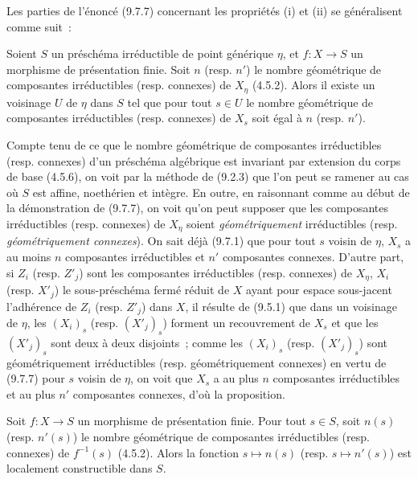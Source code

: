 
Les parties de l'énoncé (9.7.7) concernant les propriétés (i) et (ii) se
généralisent comme suit~:

\begin{proposition}[9.7.8]
\label{IV.9.7.8-fr}
Soient $S$ un préschéma irréductible de point générique $\eta$, et $f:X\to S$
un morphisme de présentation finie. Soit $n$ (resp. $n'$) le nombre géométrique
de composantes irréductibles (resp. connexes) de $X_\eta$ (4.5.2). Alors il
existe un voisinage $U$ de $\eta$ dans $S$ tel que pour tout $s\in U$ le nombre
géométrique de composantes irréductibles (resp. connexes) de $X_s$ soit égal à
$n$ (resp. $n'$).
\end{proposition}

Compte tenu de ce que le nombre géométrique de composantes irréductibles (resp.
connexes) d'un préschéma algébrique est invariant par extension du corps de
base (4.5.6), on voit par la méthode de (9.2.3) que l'on peut se ramener au cas
où $S$ est affine, noethérien et intègre. En outre, en raisonnant comme au début
de la démonstration de (9.7.7), on voit qu'on peut supposer que les composantes
irréductibles (resp. connexes) de $X_\eta$ soient \emph{géométriquement}
irréductibles (resp. \emph{géométriquement connexes}). On sait déjà (9.7.1) que
pour tout $s$ voisin de $\eta$, $X_s$ a au moins $n$ composantes irréductibles
et $n'$ composantes connexes. D'autre part, si $Z_i$ (resp. $Z'_j$) sont les
composantes irréductibles (resp. connexes) de $X_\eta$, $X_i$ (resp. $X'_j$) le
sous-préschéma fermé réduit de $X$ ayant pour espace sous-jacent l'adhérence de
$Z_i$ (resp. $Z'_j$) dans $X$, il résulte de (9.5.1) que dans un voisinage de
$\eta$, les $(X_i)_s$ (resp. $(X'_j)_s$) forment un recouvrement de $X_s$ et que
les $(X'_j)_s$ sont deux à deux disjoints~; comme les $(X_i)_s$ (resp.
$(X'_j)_s$) sont géométriquement irréductibles (resp. géométriquement connexes)
en vertu de (9.7.7) pour $s$ voisin de $\eta$, on voit que $X_s$ a au plus $n$
composantes irréductibles et au plus $n'$ composantes connexes, d'où la
proposition.

\begin{corollary}[9.7.9]
\label{IV.9.7.9-fr}
Soit $f:X\to S$ un morphisme de présentation finie. Pour tout $s\in S$, soit
$n(s)$ (resp. $n'(s)$) le nombre géométrique de composantes irréductibles
(resp. connexes) de $f^{-1}(s)$ (4.5.2). Alors la fonction $s\mapsto n(s)$
(resp. $s\mapsto n'(s)$) est localement constructible dans $S$.
\end{corollary}

